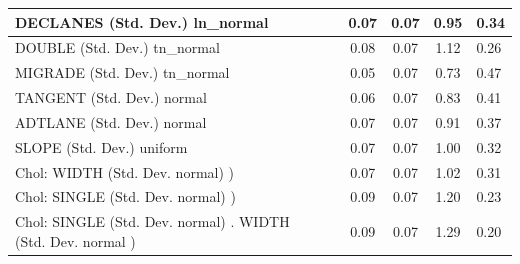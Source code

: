 \begin{table}
\begin{center}
\begin{tabular}{|l|l|c|c|c|l|}
			\hline
			DECLANES (Std. Dev.) ln_normal &  & 0.07 & 0.07 & 0.95 & 0.34 \\
			\hline
			DOUBLE (Std. Dev.) tn_normal &  & 0.08 & 0.07 & 1.12 & 0.26 \\
			\hline
			MIGRADE (Std. Dev.) tn_normal &  & 0.05 & 0.07 & 0.73 & 0.47 \\
			\hline
			TANGENT (Std. Dev.) normal &  & 0.06 & 0.07 & 0.83 & 0.41 \\
			\hline
			ADTLANE (Std. Dev.) normal &  & 0.07 & 0.07 & 0.91 & 0.37 \\
			\hline
			SLOPE (Std. Dev.) uniform &  & 0.07 & 0.07 & 1.00 & 0.32 \\
			\hline
			 Chol: WIDTH (Std. Dev. normal) ) &  & 0.07 & 0.07 & 1.02 & 0.31 \\
			\hline
			 Chol: SINGLE (Std. Dev. normal) ) &  & 0.09 & 0.07 & 1.20 & 0.23 \\
			\hline
			 Chol: SINGLE (Std. Dev. normal) . WIDTH (Std. Dev.   normal ) &  & 0.09 & 0.07 & 1.29 & 0.20 \\
			\hline
		\end{tabular}
	\end{center}
\end{table}